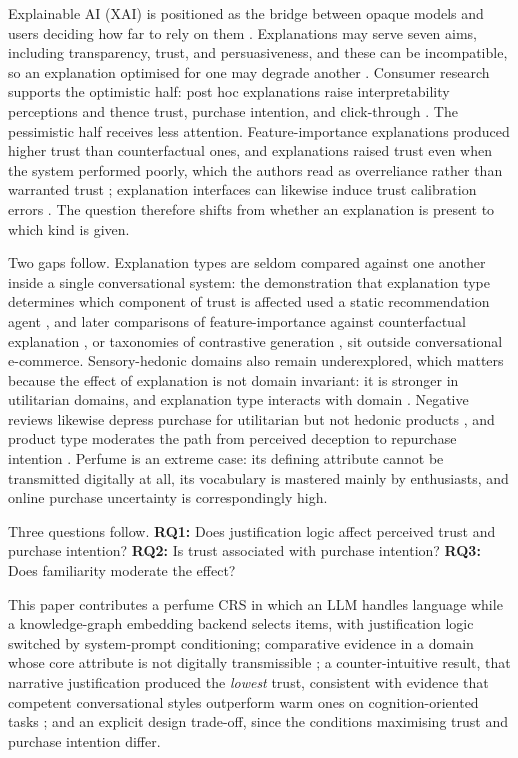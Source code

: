 \documentclass[conference]{IEEEtran}
\begin{document}
Explainable AI (XAI) is positioned as the bridge between opaque models and users deciding
how far to rely on them \cite{rong2024}. Explanations may serve seven aims, including
transparency, trust, and persuasiveness, and these can be incompatible, so an explanation
optimised for one may degrade another \cite{tintarev2012}. Consumer research supports the
optimistic half: post hoc explanations raise interpretability perceptions and thence trust,
purchase intention, and click-through \cite{chen2024}. The pessimistic half receives less
attention. Feature-importance explanations produced higher trust than counterfactual ones,
and explanations raised trust even when the system performed poorly, which the authors read
as overreliance rather than warranted trust \cite{brito2023}; explanation interfaces can
likewise induce trust calibration errors \cite{naiseh2021}. The question therefore shifts
from whether an explanation is present to which kind is given.

Two gaps follow. Explanation types are seldom compared against one another inside a single
conversational system: the demonstration that explanation type determines which component
of trust is affected used a static recommendation agent \cite{wang2007}, and later
comparisons of feature-importance against counterfactual explanation \cite{brito2023}, or
taxonomies of contrastive generation \cite{stepin2021}, sit outside conversational
e-commerce. Sensory-hedonic domains also remain underexplored, which matters because the
effect of explanation is not domain invariant: it is stronger in utilitarian domains, and
explanation type interacts with domain \cite{chen2024}. Negative reviews likewise depress
purchase for utilitarian but not hedonic products \cite{varga2024}, and product type
moderates the path from perceived deception to repurchase intention \cite{wangx2022}.
Perfume is an extreme case: its defining attribute cannot be transmitted digitally at all,
its vocabulary is mastered mainly by enthusiasts, and online purchase uncertainty is
correspondingly high.

Three questions follow. \textbf{RQ1:} Does justification logic affect perceived trust and
purchase intention? \textbf{RQ2:} Is trust associated with purchase intention?
\textbf{RQ3:} Does familiarity moderate the effect?

This paper contributes a perfume CRS in which an LLM handles language while a
knowledge-graph embedding backend selects items, with justification logic switched by
system-prompt conditioning; comparative evidence in a domain whose core attribute is not
digitally transmissible \cite{chen2024}; a counter-intuitive result, that narrative
justification produced the \textit{lowest} trust, consistent with evidence that competent
conversational styles outperform warm ones on cognition-oriented tasks \cite{libaoku2024};
and an explicit design trade-off, since the conditions maximising trust and purchase
intention differ.
\end{document}
